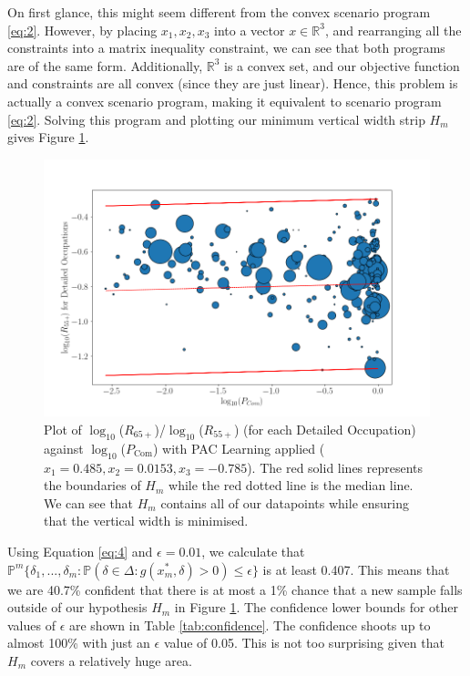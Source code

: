 \documentclass[11pt]{article}
\begin{document}
On first glance, this might seem different from the convex scenario program \ref{eq:2}. However, by placing $x_{1},x_{2},x_{3}$ into a vector $x \in \mathbb{R}^{3}$, and rearranging all the constraints into a matrix inequality constraint, we can see that both programs are of the same form. Additionally, $\mathbb{R}^{3}$ is a convex set, and our objective function and constraints are all convex (since they are just linear). Hence, this problem is actually a convex scenario program, making it equivalent to scenario program \ref{eq:2}. Solving this program and plotting our minimum vertical width strip $H_{m}$ gives Figure \ref{fig:pac}.


\begin{figure}[!htb]
	\centering
	\includegraphics[width=15cm]{Figures/pac2.png}
	\caption{Plot of $\log_{10}$($R_{65+}$)/$\log_{10}$($R_{55+}$) (for each Detailed Occupation) against $\log_{10}$($P_{\text{Com}}$) with PAC Learning applied ($x_{1}=0.485, x_{2}=0.0153, x_{3}=-0.785$). The red solid lines represents the boundaries of $H_{m}$ while the red dotted line is the median line. We can see that $H_{m}$ contains all of our datapoints while ensuring that the vertical width is minimised.}
	\label{fig:pac}
\end{figure}

Using Equation \ref{eq:4} and $\epsilon=0.01$, we calculate that $\mathbb{P}^{m} \{\delta_{1},...,\delta_{m}: \mathbb{P}(\delta \in \Delta: g(x^{*}_{m},\delta) > 0) \leq \epsilon \}$ is at least 0.407. This means that we are 40.7\% confident that there is at most a 1\% chance that a new sample falls outside of our hypothesis $H_{m}$ in Figure \ref{fig:pac}. The confidence lower bounds for other values of $\epsilon$ are shown in Table \ref{tab:confidence}. The confidence shoots up to almost 100\% with just an $\epsilon$ value of 0.05. This is not too surprising given that $H_{m}$ covers a relatively huge area.
\end{document}
